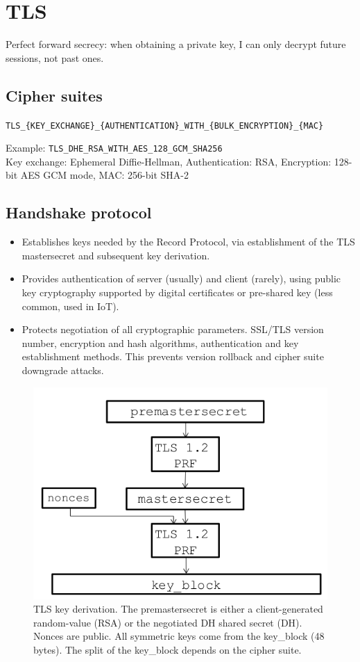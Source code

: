 \documentclass[11pt,oneside,a4paper]{article}
\begin{document}
\newpage

\section{TLS}

Perfect forward secrecy: when obtaining a private key, I can only decrypt future sessions, not past ones.

\subsection{Cipher suites}

\texttt{TLS\_\{KEY\_EXCHANGE\}\_\{AUTHENTICATION\}\_WITH\_\{BULK\_ENCRYPTION\}\_\{MAC\}}

\noindent Example: \texttt{TLS\_DHE\_RSA\_WITH\_AES\_128\_GCM\_SHA256}\\
Key exchange: Ephemeral Diffie-Hellman, Authentication: RSA, Encryption: 128-bit AES GCM mode, MAC: 256-bit SHA-2

\subsection{Handshake protocol}

\vspace{-\topsep}
\begin{itemize}
	\setlength{\itemsep}{0pt}
	\setlength{\parskip}{0pt}
	\item Establishes keys needed by the Record Protocol, via establishment of the TLS mastersecret and subsequent key derivation.
	\item Provides authentication of server (usually) and client (rarely), using public key cryptography supported by digital certificates or pre-shared key (less common, used in IoT).
	\item Protects negotiation of all cryptographic parameters. SSL/TLS version number, encryption and hash algorithms, authentication and key establishment methods. This prevents version rollback and cipher suite downgrade attacks.
\end{itemize}
\vspace{-\topsep}

\begin{figure}[hb]
	\centering
	\includegraphics[width=0.4\linewidth]{figures/tls_key_derivation}
	\caption{TLS key derivation. The premastersecret is either a client-generated random-value (RSA) or the negotiated DH shared secret (DH). Nonces are public. All symmetric keys come from the key\_block (48 bytes). The split of the key\_block depends on the cipher suite.}
	\label{fig:tlskeyderivation}
\end{figure}
\end{document}
